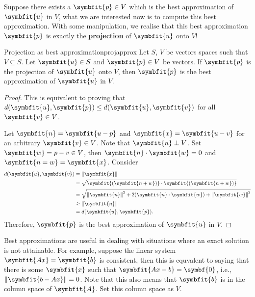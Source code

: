 \documentclass[math]{amznotes}
\theoremstyle{remark}
\begin{document}
Suppose there exists a $\symbfit{p} \in V$ which is the best approximation of $\symbfit{u}$ in $V$, what we are interested now is to compute this best approximation. With some manipulation, we realise that this best approximation $\symbfit{p}$ is exactly the {\color{red} \textbf{projection}} of $\symbfit{u}$ onto $V$!
\begin{thmbox}{Projection as best approximation}{projapprox}
    Let $S$, $V$ be vectors spaces such that $V \subseteq S$. Let $\symbfit{u} \in S$ and $\symbfit{p} \in V$ be vectors. If $\symbfit{p}$ is the projection of $\symbfit{u}$ onto $V$, then $\symbfit{p}$ is the best approximation of $\symbfit{u}$ in $V$.
    \tcblower
    \begin{proof}
        This is equivalent to proving that $d(\symbfit{u}, \symbfit{p}) \leq d(\symbfit{u}, \symbfit{v})$ for all $\symbfit{v} \in V$.

        Let $\symbfit{n} = \symbfit{u - p}$ and $\symbfit{x} = \symbfit{u - v}$ for an arbitrary $\symbfit{v} \in V$. Note that $\symbfit{n} \perp V$. Set $\symbfit{w} = {p - v} \in V$, then $\symbfit{n} \cdot \symbfit{w} = 0$ and $\symbfit{n = w} = \symbfit{x}$. Consider
        \begin{align*}
            d(\symbfit{u}, \symbfit{v}) & = \left\lVert \symbfit{x} \right\rVert                                                                                      \\
                                        & = \sqrt{\symbfit{(\symbfit{n + w})} \cdot \symbfit{(\symbfit{n + w})}}                                                      \\
                                        & = \sqrt{\left\lVert \symbfit{n} \right\rVert^2 + 2(\symbfit{n} \cdot \symbfit{w}) + \left\lVert \symbfit{w} \right\rVert^2} \\
                                        & \geq \left\lVert \symbfit{n} \right\rVert                                                                                   \\
                                        & = d(\symbfit{u}, \symbfit{p}).
        \end{align*}
        Therefore, $\symbfit{p}$ is the best approximation of $\symbfit{u}$ in $V$.
    \end{proof}
\end{thmbox}
Best approximations are useful in dealing with situations where an exact solution is not attainable. For example, suppose the linear system $\symbfit{Ax} = \symbfit{b}$ is consistent, then this is equvalent to saying that there is some $\symbfit{x}$ such that $\symbfit{Ax - b} = \symbf{0}$, i.e., $\left\lVert\symbfit{b - Ax}\right\rVert = 0$. Note that this also means that $\symbfit{b}$ is in the column space of $\symbfit{A}$. Set this column space as $V$.
\end{document}
